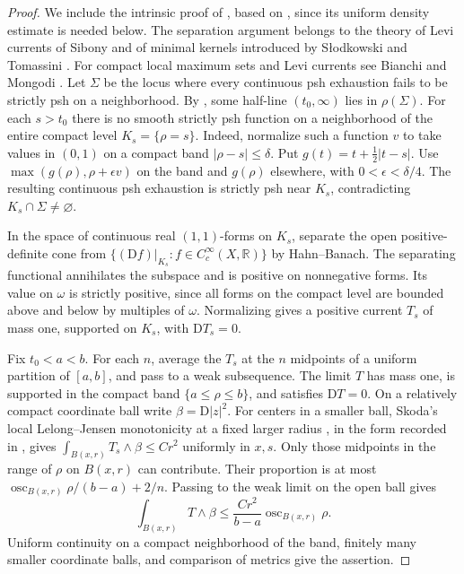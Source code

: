 \documentclass[11pt]{amsart}
\theoremstyle{remark}
\numberwithin{equation}{section}
\newcommand{\D}{\mathrm{D}}
\newcommand{\R}{\mathbb R}
\DeclareMathOperator{\osc}{osc}
\begin{document}
\begin{proof}
We include the intrinsic proof of \cite[Proposition~2.1]{Oct}, based
on \cite[Lemma~5.3]{CX}, since its uniform density estimate is needed
below. The separation argument belongs to the theory of Levi currents
of Sibony \cite{Sibony} and of minimal kernels introduced by
S{\l}odkowski and Tomassini \cite{ST}. For compact local maximum sets
and Levi currents see Bianchi and Mongodi
\cite[Theorem~1.1 and Lemma~2.8]{BM}. Let \(\Sigma\) be the
locus where every continuous psh exhaustion fails to be strictly psh on a
neighborhood. By \cite[Lemma 2.1]{MS}, some half-line \((t_0,\infty)\)
lies in \(\rho(\Sigma)\). For each \(s>t_0\) there is no smooth strictly
psh function on a neighborhood of the entire compact level \(K_s=\{\rho=s\}\).
Indeed, normalize such a function \(v\) to take values in \((0,1)\) on
a compact band \(|\rho-s|\leq\delta\). Put \(g(t)=t+\tfrac12|t-s|\).
Use \(\max(g(\rho),\rho+\epsilon v)\) on the band and \(g(\rho)\)
elsewhere, with \(0<\epsilon<\delta/4\). The resulting continuous psh
exhaustion is strictly psh near \(K_s\), contradicting \(K_s\cap\Sigma\ne
\varnothing\).

In the space of continuous real \((1,1)\)-forms on \(K_s\), separate
the open positive-definite cone from
\(\{(\D f)|_{K_s}: f\in C_c^\infty(X,\R)\}\) by Hahn--Banach.
The separating functional annihilates the subspace and is positive on
nonnegative forms. Its value on \(\omega\) is strictly positive, since
all forms on the compact level are bounded above and below by multiples
of \(\omega\). Normalizing gives a positive current \(T_s\) of mass one,
supported on \(K_s\), with \(\D T_s=0\).

Fix \(t_0<a<b\). For each \(n\), average the \(T_s\) at the \(n\)
midpoints of a uniform partition of \([a,b]\), and pass to a weak
subsequence. The limit \(T\) has mass one, is supported in the compact
band \(\{a\leq\rho\leq b\}\), and satisfies \(\D T=0\). On a relatively
compact coordinate ball write \(\beta=\D|z|^2\). For centers in a
smaller ball, Skoda's local Lelong--Jensen monotonicity at a fixed
larger radius \cite[Proposition~1]{Skoda}, in the form recorded in
\cite[Appendix B, (B.1)--(B.2)]{DNS}, gives
\(\int_{B(x,r)}T_s\wedge\beta\leq C r^2\) uniformly in \(x,s\).
Only those midpoints in the range of \(\rho\) on \(B(x,r)\) can
contribute. Their proportion is at most
\(\osc_{B(x,r)}\rho/(b-a)+2/n\). Passing to the weak limit on the open
ball gives
\[
  \int_{B(x,r)}T\wedge\beta
  \leq \frac{Cr^2}{b-a}\osc_{B(x,r)}\rho .
\]
Uniform continuity on a compact neighborhood of the band, finitely many
smaller coordinate balls, and comparison of metrics give the assertion.
\end{proof}
\end{document}

